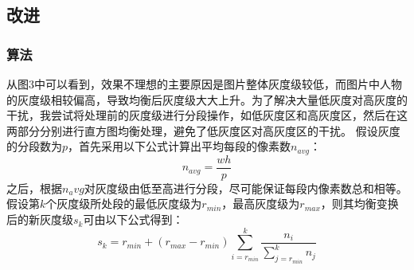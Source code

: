 \documentclass[UTF8]{ctexart}
\begin{document}
		\subsection{改进}
			\subsubsection{算法}
			从图3中可以看到，效果不理想的主要原因是图片整体灰度级较低，而图片中人物的灰度级相较偏高，导致均衡后灰度级大大上升。为了解决大量低灰度对高灰度的干扰，我尝试将处理前的灰度级进行分段操作，如低灰度区和高灰度区，然后在这两部分分别进行直方图均衡处理，避免了低灰度区对高灰度区的干扰。\newline
			\indent 假设灰度的分段数为$p$，首先采用以下公式计算出平均每段的像素数$n_{avg}$：
			\[ n_{avg} = \frac{wh}{p} \]
			之后，根据$n_avg$对灰度级由低至高进行分段，尽可能保证每段内像素数总和相等。假设第$k$个灰度级所处段的最低灰度级为$r_{min}$，最高灰度级为$r_{max}$，则其均衡变换后的新灰度级$s_k$可由以下公式得到：
		\[ s_k=r_{min}+(r_{max}-r_{min})\sum_{i=r_{min}}^k\frac{n_i}{\sum_{j=r_{min}}^kn_j} \]
\end{document}
